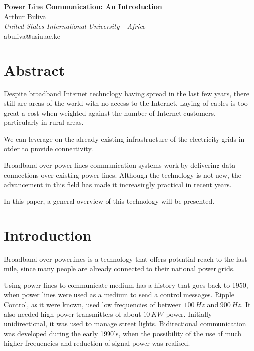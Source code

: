 \documentclass[11pt]{article}
\begin{document}
\noindent
\begin{center}
\textbf{
{\huge Power Line Communication: An Introduction}
}\\
\vspace{0.2in}
Arthur Buliva\\
\emph{United States International University - Africa}\\
abuliva@usiu.ac.ke
\end{center}



\begin{multicols}{2}

\section*{Abstract}
Despite broadband Internet technology having spread in the last few years, there still are areas of the world with no access to the Internet. Laying of cables is too great a cost when weighted against the number of Internet customers, particularly in rural areas.

We can leverage on the already existing infrastructure of the electricity grids in otder to provide connectivity.

Broadband over power lines communication systems work by delivering data connections over existing power lines. Although the technology is not new, the advancement in this field has made it increasingly practical in recent years.

In this paper, a general overview of this technology will be presented.

\section*{Introduction}

Broadband over powerlines is a technology that offers potential reach to the last mile, since many people are already connected to their national power grids.

Using power lines to communicate medium has a history that goes back to 1950, when power lines were used as a medium to send a control messages. Ripple Control, as it were known, used low frequencies of between $100\,Hz$ and $900\,Hz$. It also needed high power transmitters of about $10\,KW$ power. Initially unidirectional, it was used to manage street lights. Bidirectional communication was developed during the early 1990's, when the possibility of the use of much higher frequencies and reduction of signal power was realised.


\end{multicols}
\end{document}
